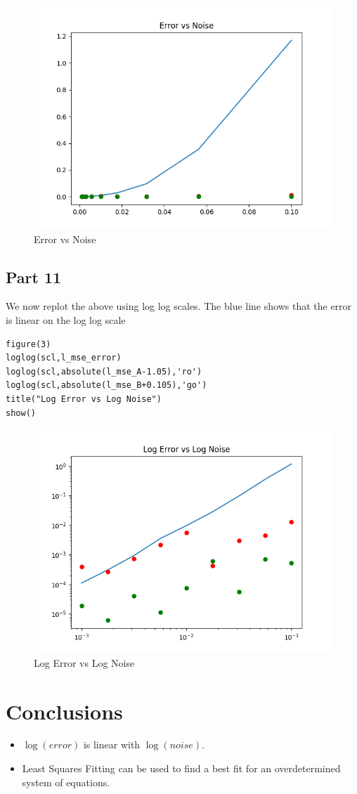 \documentclass[11pt, a4paper]{article}
\begin{document}
\begin{figure}[!tbh]
   	\centering
   	\includegraphics[scale=0.5]{Assignment_3_Qn10.png}
   	\caption{Error vs Noise}
   	\label{fig:EVN}
   \end{figure}


 \subsection{Part 11}
 We now replot the above using log log scales.
 The blue line shows that the error is linear on the log log scale
 \begin{verbatim}
figure(3)
loglog(scl,l_mse_error)
loglog(scl,absolute(l_mse_A-1.05),'ro')
loglog(scl,absolute(l_mse_B+0.105),'go')
title("Log Error vs Log Noise")
show()
\end{verbatim}
\begin{figure}[!tbh]
   	\centering
   	\includegraphics[scale=0.5]{Assignment_3_Qn11.png}
   	\caption{Log Error vs Log Noise}
   	\label{fig:loglog}
   \end{figure}

\section{Conclusions}
\begin{itemize}
    \item $\log(error)$ is linear with $\log(noise)$.
    \item Least Squares Fitting can be used to find a best fit for an overdetermined system of equations.
\end{itemize}
\end{document}
